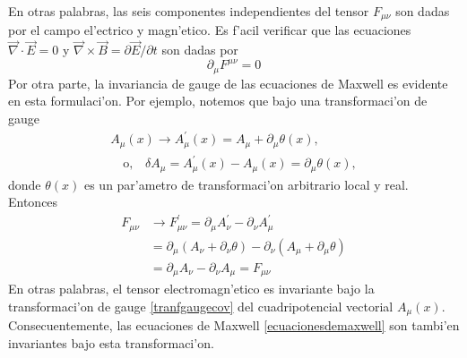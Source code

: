 En otras palabras, las seis componentes independientes del tensor $F_{\mu\nu}$ son dadas por el campo el'ectrico y magn'etico.
Es f'acil verificar que las ecuaciones $\vec{\nabla}\cdot\vec{E}=0$ y $\vec{\nabla}\times\vec{B}=\partial\vec{E}/\partial t$ son dadas por
\begin{equation}
\partial_{\mu}F^{\mu\nu}=0 \label{ecuacionesdemaxwell}
\end{equation}
Por otra parte, la invariancia de gauge de las ecuaciones de Maxwell es evidente en esta formulaci'on. Por ejemplo, notemos que bajo una transformaci'on de gauge
\begin{equation}
\begin{aligned}
A_{\mu}(x)\rightarrow A^\prime_{\mu}(x)=A_{\mu}+\partial_\mu \theta(x), \\
\quad \text{o},\,\,\,\,\, \delta A_{\mu}=A^\prime_{\mu}(x)-A_{\mu}(x)= \partial_\mu \theta(x), \label{tranfgaugecov}
\end{aligned}
\end{equation}
donde $\theta(x)$ es un par'ametro de transformaci'on  arbitrario local y real. Entonces
\begin{equation}
\begin{aligned}
F_{\mu\nu}&\rightarrow  F^{\prime}_{\mu\nu}=\partial_\mu A^{\prime}_\nu-\partial_\nu A^{\prime}_\mu \\
&= \partial_\mu (A_\nu+\partial_\nu \theta)-\partial_\nu (A_\mu+\partial_\mu \theta) \\
&= \partial_\mu A_\nu-\partial_\nu A_\mu=F_{\mu\nu}
\end{aligned}
\end{equation}
En otras palabras, el tensor electromagn'etico es invariante bajo la transformaci'on de gauge \eqref{tranfgaugecov} del cuadripotencial vectorial $A_\mu (x)$. Consecuentemente, las ecuaciones de Maxwell \eqref{ecuacionesdemaxwell} son tambi'en invariantes bajo esta transformaci'on.